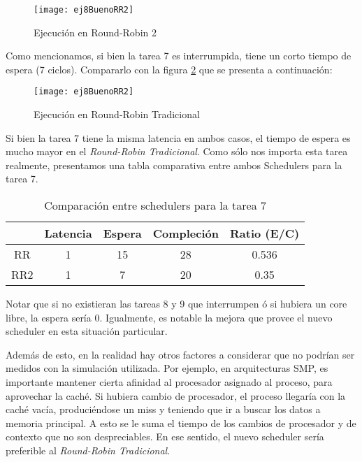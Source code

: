 \begin{figure}[h]
    \texttt{[image: ej8BuenoRR2]}
    \caption{Ejecución en Round-Robin 2}
    \label{RR2Bueno}
\end{figure}

Como mencionamos, si bien la tarea 7 es interrumpida, tiene un corto tiempo de espera (7 ciclos). Compararlo con la figura \ref{RR2Malo} que se presenta a continuación:

\begin{figure}[h]
    \texttt{[image: ej8BuenoRR2]}
    \caption{Ejecución en Round-Robin Tradicional}
    \label{RR2Malo}
\end{figure}

Si bien la tarea 7 tiene la misma latencia en ambos casos, el tiempo de espera es mucho mayor en el \textit{Round-Robin Tradicional}. Como sólo nos importa esta tarea realmente, presentamos una tabla comparativa entre ambos Schedulers para la tarea 7.

\begin{table}[h]
  \caption{Comparación entre schedulers para la tarea 7}
  \centering
    \begin{tabular}{c c c c c}
    \hline
            & Latencia & Espera & Compleción & Ratio (E/C) \\
    \hline
        RR  &     1    &   15   &     28     &    0.536    \\
        RR2 &     1    &    7   &     20     &    0.35     \\
    \end{tabular}
\end{table}

Notar que si no existieran las tareas 8 y 9 que interrumpen ó si hubiera un core libre, la espera sería 0. Igualmente, es notable la mejora que provee el nuevo scheduler en esta situación particular.

Además de esto, en la realidad hay otros factores a considerar que no podrían ser medidos con la simulación utilizada. Por ejemplo, en arquitecturas SMP, es importante mantener cierta afinidad al procesador asignado al proceso, para aprovechar la caché. Si hubiera cambio de procesador, el proceso llegaría con la caché vacía, produciéndose un miss y teniendo que ir a buscar los datos a memoria principal. A esto se le suma el tiempo de los cambios de procesador y de contexto que no son despreciables. En ese sentido, el nuevo scheduler sería preferible al \textit{Round-Robin Tradicional}.

